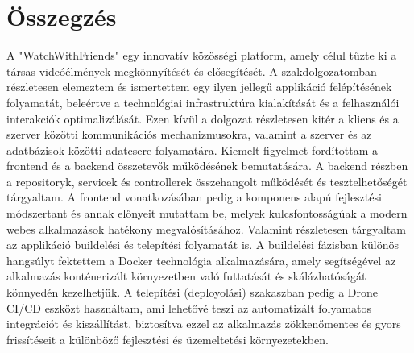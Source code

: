 \chapter{Összegz\'es}
A "WatchWithFriends" egy innovatív közösségi platform, amely célul tűzte ki a társas videóélmények megkönnyítését és elősegítését. A szakdolgozatomban részletesen elemeztem és ismertettem egy ilyen jellegű applikáció felépítésének folyamatát, beleértve a technológiai infrastruktúra kialakítását és a felhasználói interakciók optimalizálását.
Ezen kívül a dolgozat részletesen kitér a kliens és a szerver közötti kommunikációs mechanizmusokra, valamint a szerver és az adatbázisok közötti adatcsere folyamatára. Kiemelt figyelmet fordítottam a frontend és a backend összetevők működésének bemutatására. A backend részben a repositoryk, servicek és controllerek összehangolt működését és tesztelhetőségét tárgyaltam. A frontend vonatkozásában pedig a komponens alapú fejlesztési módszertant és annak előnyeit mutattam be, melyek kulcsfontosságúak a modern webes alkalmazások hatékony megvalósításához.
Valamint részletesen tárgyaltam az applikáció buildelési és telepítési folyamatát is. A buildelési fázisban különös hangsúlyt fektettem a Docker technológia alkalmazására, amely segítségével az alkalmazás konténerizált környezetben való futtatását és skálázhatóságát könnyedén kezelhetjük. A telepítési (deployolási) szakaszban pedig a Drone CI/CD eszközt használtam, ami lehetővé teszi az automatizált folyamatos integrációt és kiszállítást, biztosítva ezzel az alkalmazás zökkenőmentes és gyors frissítéseit a különböző fejlesztési és üzemeltetési környezetekben.
